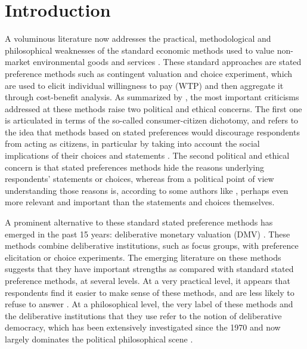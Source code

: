 \documentclass[version=3.21, pagesize, twoside=off, bibliography=totoc, DIV=calc, fontsize=12pt, a4paper, french, english]{scrartcl}
\begin{document}
\section{Introduction}
A voluminous literature now addresses the practical, methodological and philosophical weaknesses of the standard economic methods used to value non-market environmental goods and services \citep{meinard_ethical_2016}. 
These standard approaches are stated preference methods such as contingent valuation and choice experiment, which are used to elicit individual willingness to pay (WTP) and then aggregate it through cost-benefit analysis. 
As summarized by \citet{bartkowski_beyond_2018}, the most important criticisms addressed at these methods raise two political and ethical concerns. 
The first one is articulated in terms of the so-called consumer-citizen dichotomy, and refers to the idea that methods based on stated preferences would discourage respondents from acting as citizens, in particular by taking into account the social implications of their choices and statements \citep{soma_representing_2014, vatn_institutional_2009}. 
The second political and ethical concern is that stated preferences methods hide the reasons underlying respondents' statements or choices, whereas from a political point of view understanding those reasons is, according to some authors like \citet{sen_environmental_1995}, perhaps even more relevant and important than the statements and choices themselves. 

A prominent alternative to these standard stated preference methods has emerged in the past 15 years: deliberative monetary valuation (DMV) \citep{spash_deliberative_2007,bartkowski_economic_2017}. 
These methods combine deliberative institutions, such as focus groups, with preference elicitation or choice experiments. 
The emerging literature on these methods suggests that they have important strengths as compared with standard stated preference methods, at several levels. 
At a very practical level, it appears that respondents find it easier to make sense of these methods, and are less likely to refuse to answer \citep{lienhoop_contingent_2007,szabo_reducing_2011}. 
At a philosophical level, the very label of these methods and the deliberative institutions that they use refer to the notion of deliberative democracy, which has been extensively investigated since the 1970 and now largely dominates the political philosophical scene \citep{chappell_deliberative_2012}.
\end{document}

